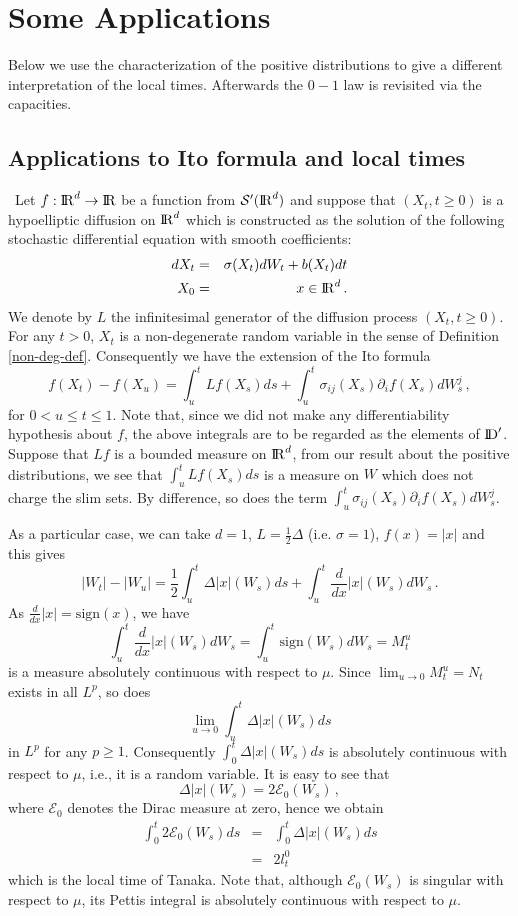 \documentclass[12pt,a4paper]{book}
\newcommand{\DD}{{\rm I\!D}}
\newcommand{\calS}{{\cal S}}
\newcommand{\R}{{\rm I\!R}}
\begin{document}
\section{Some  Applications}
Below we  use  the characterization of the  positive distributions to
give a different interpretation of the local times. Afterwards the
$0-1$ law is revisited via the capacities.
\subsection{Applications to Ito formula and local times}
 \ Let $f:\R^d\to\R$ be a function from ${\calS}'(\R^d)$ and suppose that
$(X_t,t\geq 0)$ is a hypoelliptic  diffusion on $\R^d$
which  is constructed as the solution of the following
stochastic differential equation with smooth coefficients:
\begin{eqnarray}
\label{SDE}
dX_t&=&\sigma(X_t)dW_t+b(X_t)dt\\
X_0&=&x\in \R^d\,. \nonumber
\end{eqnarray}
We denote by  $L$  the  infinitesimal generator of the diffusion
process $(X_t,t\geq 0)$. For any $t>0$, $X_t$  is a non-degenerate
random variable in the sense of Definition
\ref{non-deg-def}. Consequently  we have the extension of the  Ito
formula 
$$
f(X_t)-f(X_u)=\int_u^t Lf(X_s)ds+
\int_u^t\sigma_{ij}(X_s)\partial_i f(X_s)dW_s^j\,,
$$
for $0<u\leq t\leq 1$. Note that, since we did not make any
differentiability hypothesis about $f$, the above integrals are to be
regarded  as the elements of $\DD'$. Suppose that $Lf$ is a bounded
measure on $\R^d$, from our result about the positive distributions,
we see that $\int_u^t Lf(X_s)ds$ is a measure on $W$ which does not
charge the slim sets. By difference, so does the term
$\int_u^t\sigma_{ij}(X_s)\partial_if(X_s)dW_s^j$.

\noindent
As a particular case, we can take  $d=1$, $L=\frac{1}{2}\Delta$
(i.e. $\sigma=1$), $f(x)=|x|$ and this gives
$$
|W_t|-|W_u|=\frac{1}{2}\int_u^t\Delta|x|(W_s)ds+
\int_u^t\frac{d}{dx}|x|(W_s)dW_s\,.
$$
As $\frac{d}{dx}|x|={\mbox{sign}}(x)$, we have
$$
\int_u^t\frac{d}{dx}|x|(W_s)dW_s= \int_u^t{\mbox{sign}}(W_s)dW_s=M_t^u
$$
is a measure absolutely continuous with respect to $\mu$.
Since $\lim_{u\to0}M_t^u=N_t$ exists in all $L^p$, so does
$$
\lim_{u\to0}\int_u^t\Delta|x|(W_s)ds
$$
in $L^p$ for any $p\geq1$. Consequently $\int_0^t\Delta|x|(W_s)ds$ is
absolutely continuous with respect to $\mu$, i.e., it is a random variable.
It is easy to see that
$$
\Delta|x|(W_s)=2{\mathcal E}_0(W_s)\,,
$$
where ${\mathcal E}_0$ denotes the Dirac measure at zero, hence  we obtain
\begin{eqnarray*}
\int_0^t2{\mathcal E}_0(W_s)ds&=&\int_0^t\Delta|x|(W_s)ds\\
&=&2l_t^0
\end{eqnarray*}
which is the local time of Tanaka. Note that, although
${\mathcal E}_0(W_s)$ is singular
with respect to $\mu$, its Pettis integral is absolutely continuous with
respect to  $\mu$.
\end{document}
